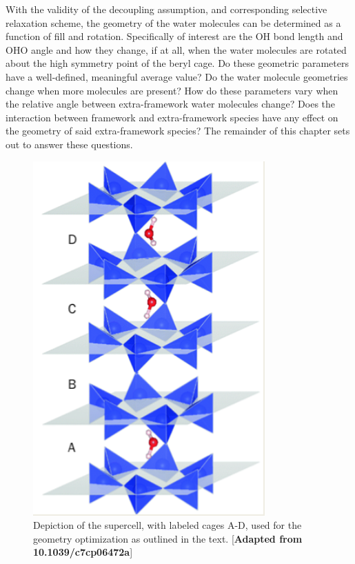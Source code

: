     With the validity of the decoupling assumption, and corresponding selective relaxation scheme, the geometry of the water molecules can be determined as a function of fill and rotation. Specifically of interest are the OH bond length and OHO angle and how they change, if at all, when the water molecules are rotated about the high symmetry point of the beryl cage. Do these geometric parameters have a well-defined, meaningful average value? Do the water molecule geometries change when more molecules are present? How do these parameters vary when the relative angle between extra-framework water molecules change? Does the interaction between framework and extra-framework species have any effect on the geometry of said extra-framework species? The remainder of this chapter sets out to answer these questions.
    
    
    \begin{figure}
        \centering
        \includegraphics{Figures/System/geometry_supercell.png}
        \caption{Depiction of the supercell, with labeled cages A-D, used for the geometry optimization as outlined in the text. [\textbf{Adapted from 10.1039/c7cp06472a}]}
        \label{fig:geom_supercell}
    \end{figure}
    
